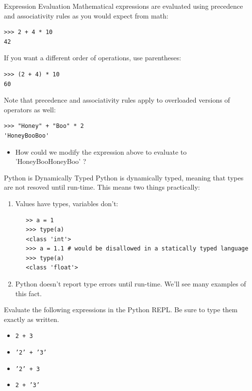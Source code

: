 \documentclass[smaller, aspectratio=1610]{beamer}
\begin{document}
\begin{frame}[label={sec:org10237e4},fragile]{Expression Evaluation}
 Mathematical expressions are evaluated using precedence and associativity rules as you would expect from math:

\lstset{language=Python,label= ,caption= ,captionpos=b,numbers=none}
\begin{lstlisting}
>>> 2 + 4 * 10
42
\end{lstlisting}

If you want a different order of operations, use parentheses:

\lstset{language=Python,label= ,caption= ,captionpos=b,numbers=none}
\begin{lstlisting}
>>> (2 + 4) * 10
60

\end{lstlisting}

Note that precedence and associativity rules apply to overloaded versions of operators as well:

\lstset{language=Python,label= ,caption= ,captionpos=b,numbers=none}
\begin{lstlisting}
>>> "Honey" + "Boo" * 2
'HoneyBooBoo'
\end{lstlisting}

\begin{itemize}
\item How could we modify the expression above to evaluate to 'HoneyBooHoneyBoo' ?
\end{itemize}
\end{frame}

\begin{frame}[label={sec:orge48332b},fragile]{Python is Dynamically Typed}
 Python is dynamically typed, meaning that types are not resoved until run-time. This means two things practically:

\begin{enumerate}
\item Values have types, variables don't:
\lstset{language=Python,label= ,caption= ,captionpos=b,numbers=none}
\begin{lstlisting}
   >> a = 1
   >>> type(a)
   <class 'int'>
   >>> a = 1.1 # would be disallowed in a statically typed language
   >>> type(a)
   <class 'float'>
\end{lstlisting}
\item Python doesn't report type errors until run-time. We'll see many examples of this fact.
\end{enumerate}

Evaluate the following expressions in the Python REPL.  Be sure to type them exactly as written.

\begin{itemize}
\item \texttt{2 + 3}
\item \texttt{'2' + '3'}
\item \texttt{'2' + 3}
\item \texttt{2 + '3'}
\end{itemize}
\end{frame}
\end{document}
